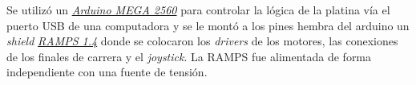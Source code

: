 \begin{figure}[H]
    \begin{floatrow}
    \end{floatrow}
\end{figure}

Se utilizó un \href{https://store.arduino.cc/usa/mega-2560-r3}{\textit{Arduino MEGA 2560}} para controlar la lógica de la platina vía el puerto USB de una computadora y se le montó a los pines hembra del arduino un \textit{shield} \href{https://reprap.org/wiki/RAMPS_1.4}{\textit{RAMPS 1.4}} donde se colocaron los \textit{drivers} de los motores, las conexiones de los finales de carrera y el \textit{joystick}. La RAMPS fue alimentada de forma independiente con una fuente de tensión.

